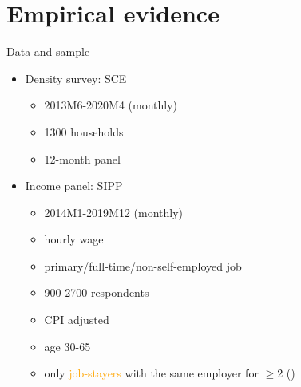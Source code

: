 \documentclass{beamer}
\begin{document}
\section{Empirical evidence}

\begin{frame}{Data and sample}
	\begin{itemize}
		\item Density survey: SCE
		\begin{itemize}
			\item 2013M6-2020M4   (monthly)
			\item 1300 households 
			\item 12-month panel 
		\end{itemize}
\item Income panel: SIPP
\begin{itemize}
	\item 2014M1-2019M12 (monthly)
	\item hourly wage 
	\item primary/full-time/non-self-employed job 
	\item 900-2700 respondents 
		\item CPI adjusted 
	\item age 30-65 
	\item only \textcolor{orange}{job-stayers} with the same employer for $\geq$2  (\cite{low2010wage})
	

\end{itemize}
\end{itemize}
\end{frame}


\end{document}
